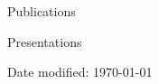 \documentclass{resume} %
\begin{document}


\begin{rSection}{Publications}
\end{rSection}

\newpage
\begin{rSection}{Presentations}
\end{rSection}

\vfill
\centering Date modified: \today
\end{document}
